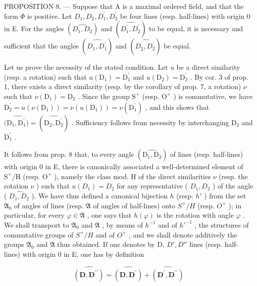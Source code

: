 PROPOSITION 8. --- Suppose that A is a maximal ordered field, and that the form \(\Phi\) is positive. Let \(D_{1}, D_{2}, D_{1}^{\prime}, D_{2}^{\prime}\) be four lines (resp. half-lines) with origin 0 in E. For the angles \((\widehat{D_{1}, D_{2}})\) and \((\widehat{D_{1}^{\prime}, D_{2}^{\prime}})\) to be equal, it is necessary and sufficient that the angles \((\widehat{D_{1}, D_{1}^{\prime}})\) and \((\widehat{D_{2}, D_{2}^{\prime}})\) be equal.

Let us prove the necessity of the stated condition. Let \(u\) be a direct similarity (resp. a rotation) such that \(u(\mathrm{D}_{1}) = \mathrm{D}_{1}^{\prime}\) and \(u(\mathrm{D}_{2}) = \mathrm{D}_{2}^{\prime}\) . By cor. 3 of prop. 1, there exists a direct similarity (resp. by the corollary of prop. 7, a rotation) \(\nu\) such that \(\nu(\mathrm{D}_{1}) = \mathrm{D}_{2}\) . Since the group \(\mathrm{S}^{+}\) (resp. \(\mathrm{O}^{+}\) ) is commutative, we have \(\mathrm{D}_{2}^{\prime} = u(\nu(\mathrm{D}_{1})) = \nu(u(\mathrm{D}_{1})) = \nu(\mathrm{D}_{1}^{\prime})\) , and this shows that \((\widehat{\mathrm{D}_{1}, \mathrm{D}_{1}^{\prime})} = (\widehat{\mathrm{D}_{2}, \mathrm{D}_{2}^{\prime}})\) . Sufficiency follows from necessity by interchanging \(\mathrm{D}_{2}\) and \(\mathrm{D}_{1}^{\prime}\) .

It follows from prop. 8 that, to every angle \((\widehat{\mathrm{D}_1,\mathrm{D}_2})\) of lines (resp. half-lines) with origin 0 in E, there is canonically associated a well-determined element of \(\mathrm{S}^{+}/\mathrm{H}\) (resp. \(\mathrm{O}^{+}\) ), namely the class mod. H of the direct similarities \(\nu\) (resp. the rotation \(\nu\) ) such that \(u(D_1) = D_2\) for any representative ( \(D_1, D_2\) ) of the angle ( \(\widehat{D_1, D_2}\) ). We have thus defined a canonical bijection \(h\) (resp. \(h'\) ) from the set \(\mathfrak{A}_0\) of angles of lines (resp. \(\mathfrak{A}\) of angles of half-lines) onto \(S^+/H\) (resp. \(O^+\) ); in particular, for every \(\varphi \in \mathfrak{A}\) , one says that \(h(\varphi)\) is the rotation with angle \(\varphi\) . We shall transport to \(\mathfrak{A}_0\) and \(\mathfrak{A}\) , by means of \(h^{-1}\) and of \(h'^{-1}\) , the structures of commutative groups of \(S^+/H\) and of \(O^+\) , and we shall denote additively the groups \(\mathfrak{A}_0\) and \(\mathfrak{A}\) thus obtained. If one denotes by D, \(D', D''\) lines (resp. half-lines) with origin 0 in E, one has by definition

\[
\widehat {(\mathbf {D} , \mathbf {D} ^ {\prime \prime})} = \widehat {(\mathbf {D} , \mathbf {D} ^ {\prime})} + \widehat {(\mathbf {D} ^ {\prime} , \mathbf {D} ^ {\prime \prime})}\tag{9}
\]

